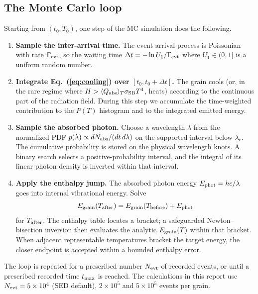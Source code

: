 \documentclass{my_memo}
\newcommand{\QplT}{\langle Q_{\rm abs} \rangle_T}
\newcommand{\sigmaSB}{\sigma_{\rm SB}}
\newcommand{\evt}{N_{\rm evt}}
\begin{document}
\subsection{The Monte Carlo loop}

Starting from $(t_0, T_0)$, one step of the MC simulation does the
following.

\begin{enumerate}
\item\textbf{Sample the inter-arrival time.}
  The event-arrival process is Poissonian with rate
  $\Gamma_{\rm evt}$, so the waiting time
  $\Delta t = -\ln U_1 / \Gamma_{\rm evt}$
  where $U_1 \in (0,1]$ is a uniform random number.
\item\textbf{Integrate Eq.~(\ref{eq:cooling}) over $[t_0, t_0+\Delta t]$.}
  The grain cools (or, in the rare regime where $H > \QplT\sigmaSB T^4$,
  heats) according to the continuous part of the radiation field.
  During this step we accumulate the time-weighted contribution to the
  $P(T)$ histogram and to the integrated emitted energy.
\item\textbf{Sample the absorbed photon.}
  Choose a wavelength $\lambda$ from the normalized PDF
  $p(\lambda) \propto dN_{\rm abs}/(dt\,d\lambda)$ on
  the supported interval below $\lambda_c$. The cumulative
  probability is stored on the physical wavelength knots. A binary
  search selects a positive-probability interval, and the integral
  of its linear photon density is inverted within that interval.
\item\textbf{Apply the enthalpy jump.}
  The absorbed photon energy $E_{\rm phot} = hc/\lambda$ goes into
  internal vibrational energy.  Solve
  \begin{equation}\label{eq:jump}
  E_{\rm grain}(T_{\rm after}) = E_{\rm grain}(T_{\rm before})
                                + E_{\rm phot}
  \end{equation}
  for $T_{\rm after}$. The enthalpy table locates a bracket; a
  safeguarded Newton--bisection inversion then evaluates the analytic
  $E_{\rm grain}(T)$ within that bracket. When adjacent representable
  temperatures bracket the target energy, the closer endpoint is
  accepted within a bounded enthalpy error.
\end{enumerate}

The loop is repeated for a prescribed number $\evt$ of recorded
events, or until a prescribed recorded time $t_{\rm max}$ is reached.
The calculations in this report use $\evt=5\times10^4$ (SED default),
$2\times10^5$ and $5\times10^5$ events per grain.
\end{document}
